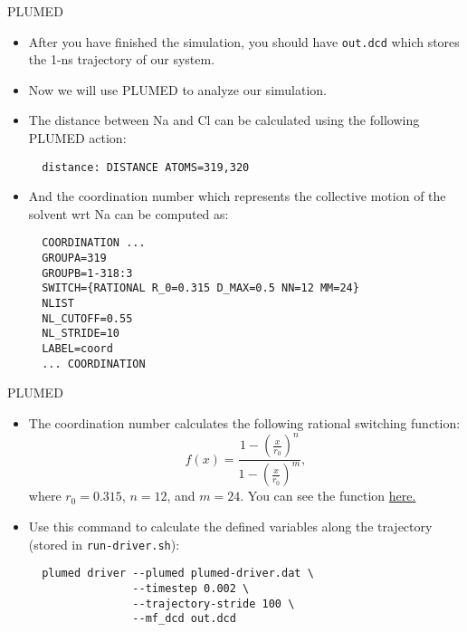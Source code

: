 \documentclass[10pt]{beamer}
\begin{document}
\begin{frame}[fragile]{PLUMED}
  \begin{itemize}
    \setlength\itemsep{1em}
    \item After you have finished the simulation, you should have \texttt{out.dcd} which stores the 1-ns trajectory of our system.
    \item Now we will use PLUMED to analyze our simulation.
    \item The distance between Na and Cl can be calculated using the following PLUMED action:
    \begin{lstlisting}
  distance: DISTANCE ATOMS=319,320
    \end{lstlisting}
    \item And the coordination number which represents the collective motion of the solvent wrt Na can be computed as:
    \begin{lstlisting}
  COORDINATION ...
  GROUPA=319
  GROUPB=1-318:3
  SWITCH={RATIONAL R_0=0.315 D_MAX=0.5 NN=12 MM=24}
  NLIST
  NL_CUTOFF=0.55
  NL_STRIDE=10
  LABEL=coord
  ... COORDINATION
    \end{lstlisting}
  \end{itemize}
\end{frame}

\begin{frame}[fragile]{PLUMED}
  \begin{itemize}
    \setlength\itemsep{1em}
    \item The coordination number calculates the following rational switching function:
    \begin{equation}
      f(x)=\frac{1 - \left( \frac{x}{r_0} \right)^n}{1 - \left( \frac{x}{r_0} \right)^m},
    \end{equation}
    where $r_0=0.315$, $n=12$, and $m=24$. You can see the function \href{https://www.desmos.com/calculator/nqujdsvj0z}{here.}

    \item Use this command to calculate the defined variables along the trajectory (stored in \texttt{run-driver.sh}):
    \begin{lstlisting}
  plumed driver --plumed plumed-driver.dat \
                --timestep 0.002 \
                --trajectory-stride 100 \
                --mf_dcd out.dcd
    \end{lstlisting}
  \end{itemize}
\end{frame}
\end{document}
